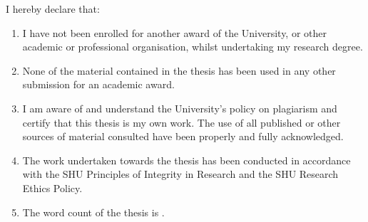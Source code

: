 \begin{declaration}
    I hereby declare that:
    \begin{enumerate}
        \item I have not been enrolled for another award of the University, or other
    academic or professional organisation, whilst undertaking my research
    degree.
        \item None of the material contained in the thesis has been used in any other
    submission for an academic award.
        \item I am aware of and understand the University's policy on plagiarism and
    certify that this thesis is my own work. The use of all published or other
    sources of material consulted have been properly and fully
    acknowledged.
        \item The work undertaken towards the thesis has been conducted in
    accordance with the SHU Principles of Integrity in Research and the
    SHU Research Ethics Policy.
        \item The word count of the thesis is
        \makeatletter
        \@wordcount
        \makeatother.
    \end{enumerate}
\end{declaration}